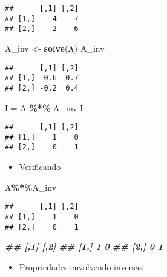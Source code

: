 \documentclass[
]{article}
\newenvironment{Shaded}{\begin{snugshade}}{\end{snugshade}}
\newcommand{\DocumentationTok}[1]{\textcolor[rgb]{0.56,0.35,0.01}{\textbf{\textit{#1}}}}
\newcommand{\FunctionTok}[1]{\textcolor[rgb]{0.13,0.29,0.53}{\textbf{#1}}}
\newcommand{\NormalTok}[1]{#1}
\newcommand{\OtherTok}[1]{\textcolor[rgb]{0.56,0.35,0.01}{#1}}
\newcommand{\SpecialCharTok}[1]{\textcolor[rgb]{0.81,0.36,0.00}{\textbf{#1}}}
\providecommand{\tightlist}{%
  \setlength{\itemsep}{0pt}\setlength{\parskip}{0pt}}
\begin{document}
\begin{verbatim}
##      [,1] [,2]
## [1,]    4    7
## [2,]    2    6
\end{verbatim}

\begin{Shaded}
\begin{Highlighting}[]
\NormalTok{A\_inv }\OtherTok{\textless{}{-}} \FunctionTok{solve}\NormalTok{(A)}
\NormalTok{A\_inv}
\end{Highlighting}
\end{Shaded}

\begin{verbatim}
##      [,1] [,2]
## [1,]  0.6 -0.7
## [2,] -0.2  0.4
\end{verbatim}

\begin{Shaded}
\begin{Highlighting}[]
\NormalTok{I }\OtherTok{=}\NormalTok{ A }\SpecialCharTok{\%*\%}\NormalTok{ A\_inv}
\NormalTok{I}
\end{Highlighting}
\end{Shaded}

\begin{verbatim}
##      [,1] [,2]
## [1,]    1    0
## [2,]    0    1
\end{verbatim}

\begin{itemize}
\tightlist
\item
  Verificando
\end{itemize}

\begin{Shaded}
\begin{Highlighting}[]
\NormalTok{A}\SpecialCharTok{\%*\%}\NormalTok{A\_inv}
\end{Highlighting}
\end{Shaded}

\begin{verbatim}
##      [,1] [,2]
## [1,]    1    0
## [2,]    0    1
\end{verbatim}

\begin{Shaded}
\begin{Highlighting}[]
\DocumentationTok{\#\# [,1] [,2]}
\DocumentationTok{\#\# [1,] 1 0}
\DocumentationTok{\#\# [2,] 0 1}
\end{Highlighting}
\end{Shaded}

\begin{itemize}
\tightlist
\item
  Propriedades envolvendo inversas
\end{itemize}
\end{document}
